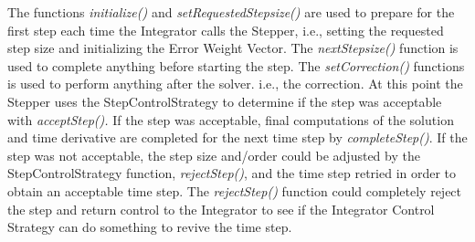 The functions \emph{initialize()} and \emph{setRequestedStepsize()}
are used to prepare for the first step each time the Integrator calls
the Stepper, i.e., setting the requested step size and initializing
the Error Weight Vector. The \emph{nextStepsize() }function is used
to complete anything before starting the step. The \emph{setCorrection()}
functions is used to perform anything after the solver. i.e., the
correction. At this point the Stepper uses the StepControlStrategy
to determine if the step was acceptable with \emph{acceptStep(). }If
the step was acceptable, final computations of the solution and time
derivative are completed for the next time step by \emph{completeStep()}.
If the step was not acceptable, the step size and/order could be adjusted
by the StepControlStrategy function, \emph{rejectStep()}, and the
time step retried in order to obtain an acceptable time step. The\emph{
rejectStep()} function could completely reject the step and return
control to the Integrator to see if the Integrator Control Strategy
can do something to revive the time step.
